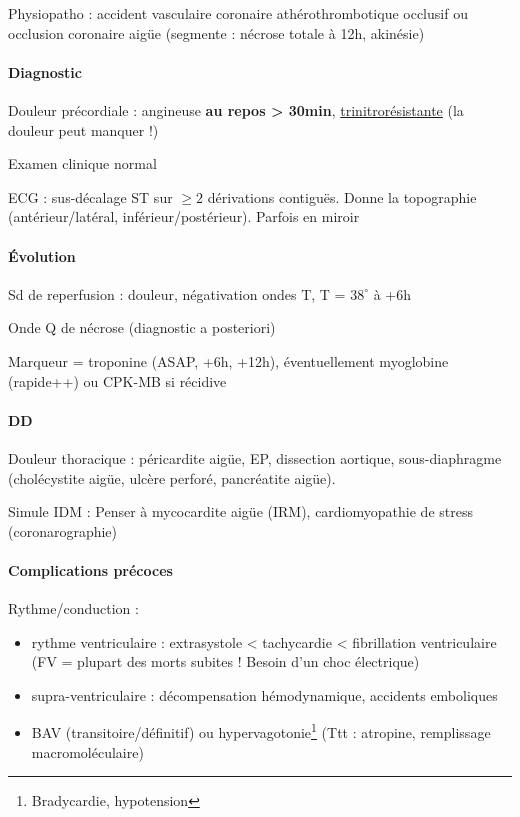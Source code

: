 Physiopatho : accident vasculaire coronaire athérothrombotique occlusif ou
occlusion coronaire aigüe (segmente : nécrose totale à 12h, akinésie)

\paragraph{Diagnostic}
Douleur précordiale : angineuse \textbf{au repos > 30min},
\underline{trinitrorésistante} (la douleur peut manquer !)

Examen clinique normal

ECG : sus-décalage ST sur $\ge 2$ dérivations contiguës. Donne la topographie
(antérieur/latéral, inférieur/postérieur).
Parfois en miroir


\paragraph{Évolution}
Sd de reperfusion : \dec douleur, négativation ondes T, T = $38^{\circ}$
à +6h

Onde Q de nécrose (diagnostic a posteriori)

Marqueur = troponine (ASAP, +6h, +12h), éventuellement myoglobine (rapide++) ou
CPK-MB si récidive

\paragraph{DD} 
Douleur thoracique : péricardite aigüe, EP, dissection aortique, sous-diaphragme (cholécystite aigüe,
ulcère perforé, pancréatite aigüe).

Simule IDM : Penser à mycocardite aigüe (IRM), cardiomyopathie de stress
(coronarographie)

\paragraph{Complications précoces}
Rythme/conduction : 
\begin{itemize}
  \item rythme ventriculaire : extrasystole < tachycardie < fibrillation
    ventriculaire (FV = plupart des morts subites ! Besoin d'un choc électrique)
  \item supra-ventriculaire : décompensation hémodynamique, accidents emboliques
  \item \gls{BAV} (transitoire/définitif) ou
    hypervagotonie\footnote{Bradycardie, hypotension} (Ttt : atropine, remplissage
    macromoléculaire)
\end{itemize}

